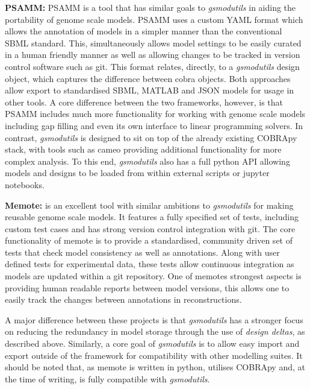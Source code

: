 \documentclass[journal=asbcd6]{achemso}
\begin{document}
\textbf{PSAMM:} PSAMM \cite{steffensen2016psamm} is a tool that has similar goals to \textit{gsmodutils} in aiding the portability of genome scale models.
PSAMM uses a custom YAML format which allows the annotation of models in a simpler manner than the conventional SBML standard.
This, simultaneously allows model settings to be easily curated in a human friendly manner as well as allowing changes to be tracked in version control software such as git.
This format relates, directly, to a \textit{gsmodutils} design object, which captures the difference between cobra objects.
Both approaches allow export to standardised SBML, MATLAB and JSON models for usage in other tools.
A core difference between the two frameworks, however, is that PSAMM includes much more functionality for working with genome scale models including gap filling and even its own interface to linear programming solvers.
In contrast, \textit{gsmodutils} is designed to sit on top of the already existing COBRApy stack, with tools such as cameo \cite{cardoso2018cameo} providing additional functionality for more complex analysis.
To this end, \textit{gsmodutils} also has a full python API allowing models and designs to be loaded from within external scripts or jupyter notebooks.

\textbf{Memote:} \cite{lieven2018memote} is an excellent tool with similar ambitions to \textit{gsmodutils} for making reusable genome scale models.
It features a fully specified set of tests, including custom test cases and has strong version control integration with git.
The core functionality of memote is to provide a standardised, community driven set of tests that check model consistency as well as annotations. 
Along with user defined tests for experimental data, these tests allow continuous integration as models are updated within a git repository.
One of memotes strongest aspects is providing human readable reports between model versions, this allows one to easily track the changes between annotations in reconstructions.

A major difference between these projects is that \textit{gsmodutils} has a stronger focus on reducing the redundancy in model storage through the use of \textit{design deltas}, as described above.
Similarly, a core goal of \textit{gsmodutils} is to allow easy import and export outside of the framework for compatibility with other modelling suites.
It should be noted that, as memote is written in python, utilises COBRApy and, at the time of writing, is fully compatible with \textit{gsmodutils}.
\end{document}
